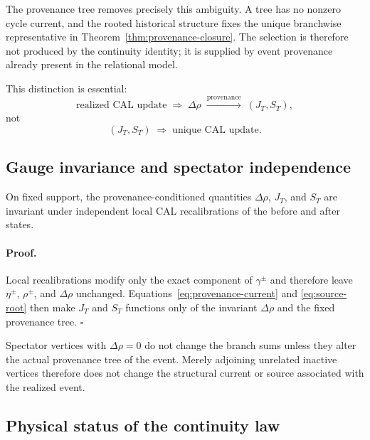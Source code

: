 The provenance tree removes precisely this ambiguity. A tree has no nonzero cycle current, and the rooted historical structure fixes the unique branchwise representative in Theorem~\ref{thm:provenance-closure}. The selection is therefore not produced by the continuity identity; it is supplied by event provenance already present in the relational model.

This distinction is essential:
\begin{equation}
\boxed{
\text{realized CAL update}
\;\Longrightarrow\;
\Delta\rho
\;\xrightarrow{\text{provenance}}\;
(J_T,S_T),
}
\label{eq:provenance-logic}
\end{equation}
not
\begin{equation}
(J_T,S_T)
\;\Longrightarrow\;
\text{unique CAL update}.
\label{eq:not-generator}
\end{equation}

\subsection{Gauge invariance and spectator independence}

\begin{proposition}
\label{prop:continuity-gauge}
On fixed support, the provenance-conditioned quantities $\Delta\rho$, $J_T$, and $S_T$ are invariant under independent local CAL recalibrations of the before and after states.
\end{proposition}

\paragraph*{Proof.}
Local recalibrations modify only the exact component of $\gamma^{\pm}$ and therefore leave $\eta^{\pm}$, $\rho^{\pm}$, and $\Delta\rho$ unchanged. Equations~\eqref{eq:provenance-current} and \eqref{eq:source-root} then make $J_T$ and $S_T$ functions only of the invariant $\Delta\rho$ and the fixed provenance tree. \hfill$\square$

Spectator vertices with $\Delta\rho=0$ do not change the branch sums unless they alter the actual provenance tree of the event. Merely adjoining unrelated inactive vertices therefore does not change the structural current or source associated with the realized event.

\subsection{Physical status of the continuity law}

